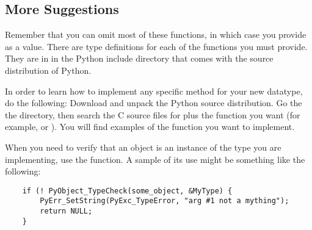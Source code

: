 \subsection{More Suggestions}

Remember that you can omit most of these functions, in which case you
provide  as a value.  There are type definitions for each of
the functions you must provide.  They are in  in the
Python include directory that comes with the source distribution of
Python.

In order to learn how to implement any specific method for your new
datatype, do the following: Download and unpack the Python source
distribution.  Go the the  directory, then search the
C source files for  plus the function you want (for
example,  or ).  You will find
examples of the function you want to implement.

When you need to verify that an object is an instance of the type
you are implementing, use the  function.
A sample of its use might be something like the following:

\begin{verbatim}
    if (! PyObject_TypeCheck(some_object, &MyType) {
        PyErr_SetString(PyExc_TypeError, "arg #1 not a mything");
        return NULL;
    }
\end{verbatim}

